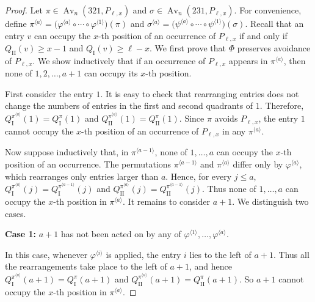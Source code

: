 \documentclass[11pt]{article}
\begin{document}
\begin{proof}
Let $\pi\in\operatorname{Av}_n(321,P_{\ell,x})$ and
$\sigma\in\operatorname{Av}_n(231,P_{\ell,x})$.
For convenience, define
$
\pi^{\langle a\rangle}
=
\bigl(
\varphi^{\langle a\rangle}\circ\cdots\circ
\varphi^{\langle1\rangle}
\bigr)(\pi)$
and
$
\sigma^{\langle a\rangle}
=
\bigl(
\psi^{\langle a\rangle}\circ\cdots\circ
\psi^{\langle1\rangle}
\bigr)(\sigma)$.
Recall that an entry $v$ can occupy the $x$-th position of an occurrence
of $P_{\ell,x}$ if and only if
$Q_{\mathrm{II}}(v)\geq x-1$ and
$Q_{\mathrm I}(v)\geq\ell-x$.
We first prove that $\Phi$ preserves avoidance of $P_{\ell,x}$. We
show inductively that if an occurrence of $P_{\ell,x}$ appears in
$\pi^{\langle a\rangle}$, then none of $1,2,\ldots,a+1$
can occupy its $x$-th position.

First consider the entry $1$. It is easy to check that rearranging entries does not change
the numbers of entries in the first and second quadrants of $1$.
Therefore,
$Q_{\mathrm I}^{\pi^{\langle a\rangle}}(1)
=
Q_{\mathrm I}^{\pi}(1)$ and
$Q_{\mathrm{II}}^{\pi^{\langle a\rangle}}(1)
=
Q_{\mathrm{II}}^{\pi}(1)$.
Since $\pi$ avoids $P_{\ell,x}$, the entry $1$ cannot occupy the
$x$-th position of an occurrence of $P_{\ell,x}$ in any
$\pi^{\langle a\rangle}$.

Now suppose inductively that, in $\pi^{\langle a-1\rangle}$, none of
$1,\ldots,a$ can occupy the $x$-th position of an occurrence. The
permutations $\pi^{\langle a-1\rangle}$ and
$\pi^{\langle a\rangle}$ differ only by
$\varphi^{\langle a\rangle}$, which rearranges only entries larger than
$a$. Hence, for every $j\leq a$,
$Q_{\mathrm I}^{\pi^{\langle a\rangle}}(j)
=
Q_{\mathrm I}^{\pi^{\langle a-1\rangle}}(j)$
and
$Q_{\mathrm{II}}^{\pi^{\langle a\rangle}}(j)
=
Q_{\mathrm{II}}^{\pi^{\langle a-1\rangle}}(j)$.
Thus none of $1,\ldots,a$ can occupy the $x$-th position in
$\pi^{\langle a\rangle}$. It remains to consider $a+1$.
We distinguish two cases.

\noindent \textbf{Case 1:} $a+1$ has not been acted on by any of
$\varphi^{\langle1\rangle},\ldots,\varphi^{\langle a\rangle}$.

In this case, whenever $\varphi^{\langle i\rangle}$ is applied, the entry
$i$ lies to the left of $a+1$. 
Thus all the rearrangements take place
to the left of $a+1$, and hence
$Q_{\mathrm I}^{\pi^{\langle a\rangle}}(a+1)
=
Q_{\mathrm I}^{\pi}(a+1)$
and
$Q_{\mathrm{II}}^{\pi^{\langle a\rangle}}(a+1)
=
Q_{\mathrm{II}}^{\pi}(a+1)$.
So $a+1$ cannot occupy the $x$-th position in $\pi^{\langle a\rangle}$.


\end{proof}
\end{document}
